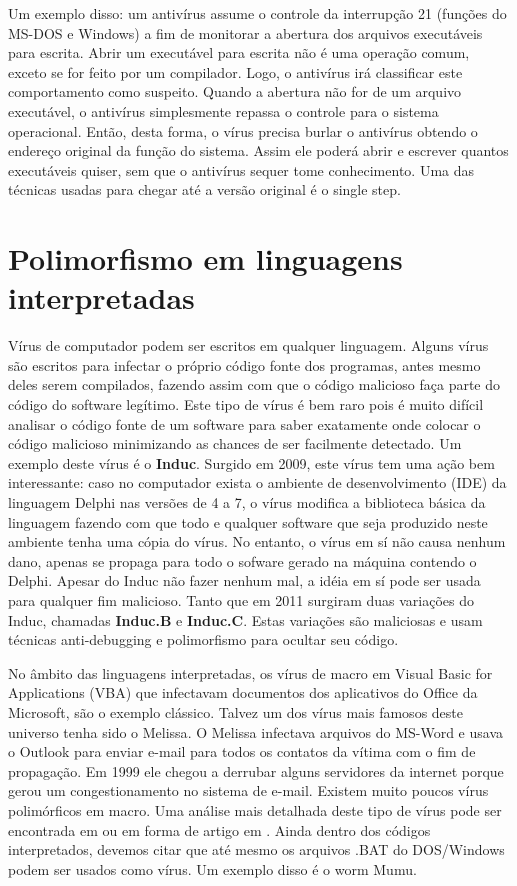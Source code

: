 Um exemplo disso: um antivírus assume o controle da interrupção 21 (funções do MS-DOS e Windows) a fim de monitorar a abertura dos arquivos executáveis para escrita. Abrir um executável para escrita não é uma operação comum, exceto se for feito por um compilador. Logo, o antivírus irá classificar este comportamento como suspeito. Quando a abertura não for de um arquivo executável, o antivírus simplesmente repassa o controle para o sistema operacional. Então, desta forma, o vírus precisa burlar o antivírus obtendo o endereço original da função do sistema. Assim ele poderá abrir e escrever quantos executáveis quiser, sem que o antivírus sequer tome conhecimento. Uma das técnicas usadas para chegar até a versão original é o single step.

\section{Polimorfismo em linguagens interpretadas}

Vírus de computador podem ser escritos em qualquer linguagem. Alguns vírus são escritos para infectar o próprio código fonte dos programas, antes mesmo deles serem compilados, fazendo assim com que o código malicioso faça parte do código do software legítimo. Este tipo de vírus é bem raro pois é muito difícil analisar o código fonte de um software para saber exatamente onde colocar o código malicioso minimizando as chances de ser facilmente detectado. Um exemplo deste vírus é o \textbf{Induc}\cite{symantec:4}. Surgido em 2009, este vírus tem uma ação bem interessante: caso no computador exista o ambiente de desenvolvimento (IDE) da linguagem Delphi\textsuperscript{\textregistered} nas versões de 4 a 7, o vírus modifica a biblioteca básica da linguagem fazendo com que todo e qualquer software que seja produzido neste ambiente tenha uma cópia do vírus. No entanto, o vírus em sí não causa nenhum dano, apenas se propaga para todo o sofware gerado na máquina contendo o Delphi. Apesar do Induc não fazer nenhum mal, a idéia em sí pode ser usada para qualquer fim malicioso. Tanto que em 2011 surgiram duas variações do Induc, chamadas \textbf{Induc.B} e \textbf{Induc.C}\cite{esset:1}. Estas variações são maliciosas e usam técnicas anti-debugging e polimorfismo para ocultar seu código.

No âmbito das linguagens interpretadas, os vírus de macro em Visual Basic for Applications (VBA) que infectavam documentos dos aplicativos do Office da Microsoft, são o exemplo clássico. Talvez um dos vírus mais famosos deste universo tenha sido o Melissa\cite{wiki:11}. O Melissa infectava arquivos do MS-Word e usava o Outlook para enviar e-mail para todos os contatos da vítima com o fim de propagação. Em 1999 ele chegou a derrubar alguns servidores da internet porque gerou um congestionamento no sistema de e-mail. Existem muito poucos vírus polimórficos em macro. Uma análise mais detalhada deste tipo de vírus pode ser encontrada em \cite{symantec:5,symantec:6} ou em forma de artigo em \cite{szappanos:1}. Ainda dentro dos códigos interpretados, devemos citar que até mesmo os arquivos .BAT do DOS/Windows podem ser usados como vírus. Um exemplo disso é o worm Mumu\cite{wiki:12}. 

